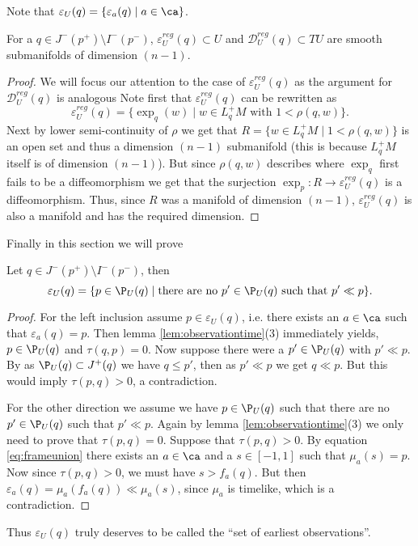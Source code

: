 Note that $\varepsilon_U(q) = \{ \varepsilon_a(q) \mid a\in \ca \}$.

\begin{proposition} For a $q\in J^-(p^+)\setminus I^-(p^-)$, $\varepsilon^{reg}_U(q)\subset U$ and $\mathcal{D}^{reg}_U(q)\subset TU$ are smooth submanifolds of dimension $(n-1)$.
\end{proposition}
\begin{proof}
We will focus our attention to the case of $\varepsilon^{reg}_U(q)$ as the argument for  $\mathcal{D}^{reg}_U(q)$ is analogous
Note first that $\varepsilon^{reg}_U(q)$ can be rewritten as 
\[
   \varepsilon^{reg}_U(q) = \{\exp_q(w) \mid  w\in L^+_qM \text{ with } 1<\rho(q,w)\}.
\]
Next by lower semi-continuity of $\rho$ we get that $R=\{w\in L^+_qM \mid 1<\rho(q,w)\}$ is an open set and thus a dimension $(n-1)$ submanifold (this is because $L^+_qM$ itself is of dimension $(n-1)$). But since $\rho(q,w)$ describes where $\exp_q$ first fails to be a diffeomorphism we get that the surjection $\exp_p:R\to \varepsilon^{reg}_U(q)$ is a diffeomorphism. Thus, since $R$ was a manifold of dimension $(n-1)$, $\varepsilon^{reg}_U(q)$ is also a manifold and has the required dimension.
\end{proof}

Finally in this section we will prove
\begin{proposition}\label{prop:seocharact}
Let $q\in J^-(p^+)\setminus I^-(p^-)$, then 
\begin{equation*}
    \varepsilon_U(q) = \{ p \in \P_U(q) \mid \text{there are no $p'\in \P_U(q)$ such that $p'\ll p$} \}.
\end{equation*}
\end{proposition}
\begin{proof}
For the left inclusion assume $p\in \varepsilon_U(q)$, i.e. there exists an $a\in \ca$ such that $\varepsilon_a(q)=p$. Then lemma \ref{lem:observationtime}(3) immediately yields, $p\in \P_U(q)$ and  $\tau(q,p)=0$. Now suppose there were a $p'\in \P_U(q)$ with $p'\ll p$. By as $\P_U(q)\subset J^+(q)$ we have $q\leq p'$, then as $p'\ll p$ we get $q\ll p$. But this would imply $\tau(p,q)>0$, a contradiction.

For the other direction we assume we have $p \in \P_U(q)$ such that there are no $p'\in\P_U(q)$ such that $p'\ll p$. Again by lemma \ref{lem:observationtime}(3) we only need to prove that $\tau(p,q)=0$. Suppose that $\tau(p,q)>0$. By equation \ref{eq:frameunion} there exists an $a\in \ca$ and a $s\in [-1,1]$ such that $\mu_a(s) = p$. Now since $\tau(p,q)>0$, we must have $s > f_a(q)$. But then $\varepsilon_a(q) = \mu_a(f_a(q)) \ll  \mu_a(s)$, since $\mu_a$ is timelike, which is a contradiction.
\end{proof}
Thus $\varepsilon_U(q)$ truly deserves to be called the \enquote{set of earliest observations}.

